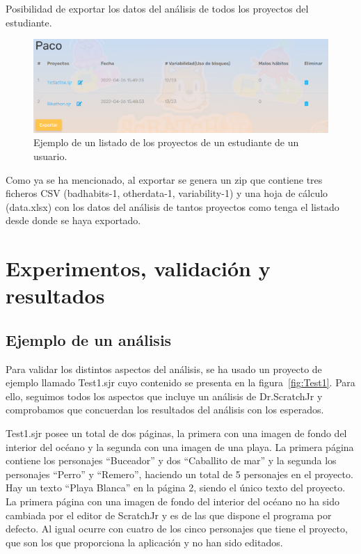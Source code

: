 \documentclass[a4paper, 12pt]{book}
\begin{document}
\begin{itemize}
    Posibilidad de exportar los datos del análisis de todos los proyectos del estudiante.
    \begin{figure}[H]
      \centering
      \includegraphics[width=16cm, keepaspectratio]{img/listado_estudiante.png}
      \caption{Ejemplo de un listado de los proyectos de un estudiante de un usuario.}
      \label{fig:listado_estudiante}
    \end{figure}
\end{itemize}
Como ya se ha mencionado, al exportar se genera un zip que contiene tres ficheros CSV (badhabits-1, otherdata-1, variability-1) y una hoja de cálculo (data.xlsx) con los datos del análisis de tantos proyectos como tenga el listado desde donde se haya exportado.



\cleardoublepage
\chapter{Experimentos, validación y resultados}
\label{chap:experimentos}

\section{Ejemplo de un análisis}
\label{sec:Test1_analisis}

Para validar los distintos aspectos del análisis, se ha usado un proyecto de ejemplo llamado Test1.sjr cuyo contenido se presenta en la figura~\ref{fig:Test1}. 
Para ello, seguimos todos los aspectos que incluye un análisis de Dr.ScratchJr y comprobamos que concuerdan los resultados del análisis con los esperados.

\vspace{5mm}
Test1.sjr posee un total de dos páginas, la primera con una imagen de fondo del interior del océano y la segunda con una imagen de una playa.
La primera página contiene los personajes ``Buceador'' y dos ``Caballito de mar'' y la segunda los personajes ``Perro'' y ``Remero'', haciendo un total de 5 personajes en el proyecto. 
Hay un texto ``Playa Blanca'' en la página 2, siendo el único texto del proyecto. 
La primera página con una imagen de fondo del interior del océano no ha sido cambiada por el editor de ScratchJr y es de las que dispone el programa por defecto.
Al igual ocurre con cuatro de los cinco personajes que tiene el proyecto, que son los que proporciona la aplicación y no han sido editados.
\end{document}
